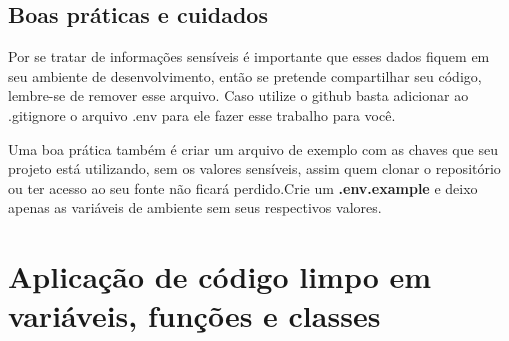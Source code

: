\subsection{Boas práticas e cuidados}

Por se tratar de informações sensíveis é importante que esses dados fiquem em seu ambiente de desenvolvimento, então se pretende compartilhar seu código, lembre-se de remover esse arquivo. Caso utilize o github basta adicionar ao .gitignore o arquivo .env para ele fazer esse trabalho para você.

Uma boa prática também é criar um arquivo de exemplo com as chaves que seu projeto está utilizando, sem os valores sensíveis, assim quem clonar o repositório ou ter acesso ao seu fonte não ficará perdido.Crie um \textbf{.env.example} e deixo apenas as variáveis de ambiente sem seus respectivos valores.

\section{Aplicação de código limpo em variáveis, funções e classes}
